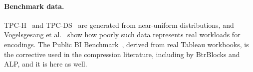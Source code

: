 \paragraph{Benchmark data.} TPC-H~\cite{tpch} and
TPC-DS~\cite{tpcds,nambiar2006tpcds} are generated from near-uniform
distributions, and Vogelsgesang et al.~\cite{vogelsgesang2018getreal} show
how poorly such data represents real workloads for encodings. The Public BI
Benchmark~\cite{publicbi,ghita2020whitebox}, derived from real Tableau
workbooks, is the corrective used in the compression literature, including by
BtrBlocks and ALP, and it is here as well.
